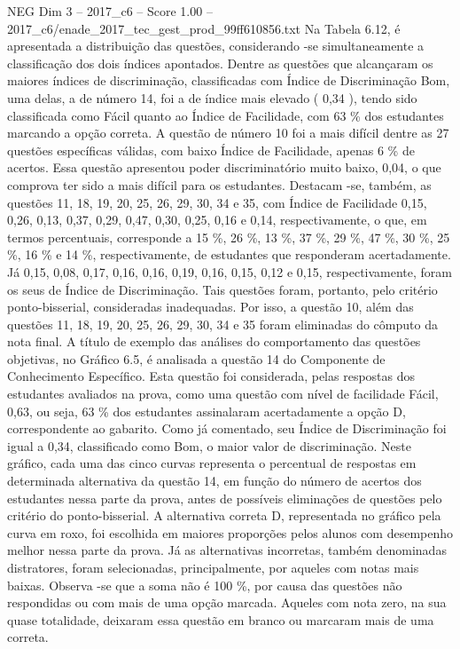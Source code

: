 \begin{textsample}{NEG Dim 3 – 2017\_c6 – Score 1.00 – 2017\_c6/enade\_2017\_tec\_gest\_prod\_99ff610856.txt}
Na Tabela 6.12, é apresentada a distribuição das questões, considerando -se simultaneamente a classificação dos dois índices apontados.
Dentre as questões que alcançaram os maiores índices de discriminação, classificadas com Índice de Discriminação Bom, uma delas, a de número 14, foi a de índice mais elevado ( 0,34 ), tendo sido classificada como Fácil quanto ao Índice de Facilidade, com 63 \% dos estudantes marcando a opção correta.
A questão de número 10 foi a mais difícil dentre as 27 questões específicas válidas, com baixo Índice de Facilidade, apenas 6 \% de acertos.
Essa questão apresentou poder discriminatório muito baixo, 0,04, o que comprova ter sido a mais difícil para os estudantes.
Destacam -se, também, as questões 11, 18, 19, 20, 25, 26, 29, 30, 34 e 35, com Índice de Facilidade 0,15, 0,26, 0,13, 0,37, 0,29, 0,47, 0,30, 0,25, 0,16 e 0,14, respectivamente, o que, em termos percentuais, corresponde a 15 \%, 26 \%, 13 \%, 37 \%, 29 \%, 47 \%, 30 \%, 25 \%, 16 \% e 14 \%, respectivamente, de estudantes que responderam acertadamente.
Já 0,15, 0,08, 0,17, 0,16, 0,16, 0,19, 0,16, 0,15, 0,12 e 0,15, respectivamente, foram os seus de Índice de Discriminação.
Tais questões foram, portanto, pelo critério ponto-bisserial, consideradas inadequadas.
Por isso, a questão 10, além das questões 11, 18, 19, 20, 25, 26, 29, 30, 34 e 35 foram eliminadas do cômputo da nota final.
A título de exemplo das análises do comportamento das questões objetivas, no Gráfico 6.5, é analisada a questão 14 do Componente de Conhecimento Específico.
Esta questão foi considerada, pelas respostas dos estudantes avaliados na prova, como uma questão com nível de facilidade Fácil, 0,63, ou seja, 63 \% dos estudantes assinalaram acertadamente a opção D, correspondente ao gabarito.
Como já comentado, seu Índice de Discriminação foi igual a 0,34, classificado como Bom, o maior valor de discriminação.
Neste gráfico, cada uma das cinco curvas representa o percentual de respostas em determinada alternativa da questão 14, em função do número de acertos dos estudantes nessa parte da prova, antes de possíveis eliminações de questões pelo critério do ponto-bisserial.
A alternativa correta D, representada no gráfico pela curva em roxo, foi escolhida em maiores proporções pelos alunos com desempenho melhor nessa parte da prova.
Já as alternativas incorretas, também denominadas distratores, foram selecionadas, principalmente, por aqueles com notas mais baixas.
Observa -se que a soma não é 100 \%, por causa das questões não respondidas ou com mais de uma opção marcada.
Aqueles com nota zero, na sua quase totalidade, deixaram essa questão em branco ou marcaram mais de uma correta.

\end{textsample}
